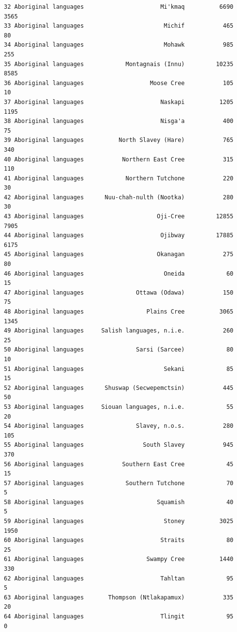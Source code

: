\documentclass[
  letterpaper,
  DIV=11,
  numbers=noendperiod]{scrartcl}
\begin{document}
\begin{verbatim}
32 Aboriginal languages                      Mi'kmaq          6690         3565
33 Aboriginal languages                       Michif           465           80
34 Aboriginal languages                       Mohawk           985          255
35 Aboriginal languages            Montagnais (Innu)         10235         8585
36 Aboriginal languages                   Moose Cree           105           10
37 Aboriginal languages                      Naskapi          1205         1195
38 Aboriginal languages                      Nisga'a           400           75
39 Aboriginal languages          North Slavey (Hare)           765          340
40 Aboriginal languages           Northern East Cree           315          110
41 Aboriginal languages            Northern Tutchone           220           30
42 Aboriginal languages      Nuu-chah-nulth (Nootka)           280           30
43 Aboriginal languages                     Oji-Cree         12855         7905
44 Aboriginal languages                      Ojibway         17885         6175
45 Aboriginal languages                     Okanagan           275           80
46 Aboriginal languages                       Oneida            60           15
47 Aboriginal languages               Ottawa (Odawa)           150           75
48 Aboriginal languages                  Plains Cree          3065         1345
49 Aboriginal languages     Salish languages, n.i.e.           260           25
50 Aboriginal languages               Sarsi (Sarcee)            80           10
51 Aboriginal languages                       Sekani            85           15
52 Aboriginal languages      Shuswap (Secwepemctsin)           445           50
53 Aboriginal languages     Siouan languages, n.i.e.            55           20
54 Aboriginal languages               Slavey, n.o.s.           280          105
55 Aboriginal languages                 South Slavey           945          370
56 Aboriginal languages           Southern East Cree            45           15
57 Aboriginal languages            Southern Tutchone            70            5
58 Aboriginal languages                     Squamish            40            5
59 Aboriginal languages                       Stoney          3025         1950
60 Aboriginal languages                      Straits            80           25
61 Aboriginal languages                  Swampy Cree          1440          330
62 Aboriginal languages                      Tahltan            95            5
63 Aboriginal languages       Thompson (Ntlakapamux)           335           20
64 Aboriginal languages                      Tlingit            95            0

\end{verbatim}
\end{document}
